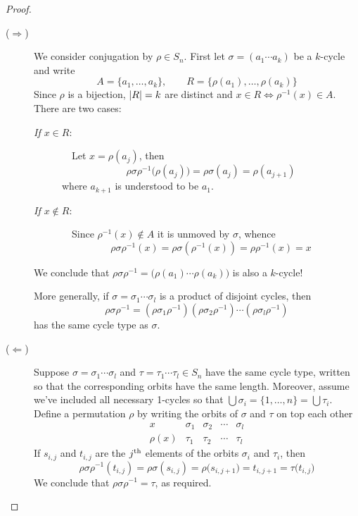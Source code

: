 \begin{proof}
	\begin{description}
		\item[\normalfont($\Rightarrow$)] We consider conjugation by $\rho\in S_n$. First let $\sigma=(a_1\cdots a_k)$ be a $k$-cycle and write
		\[
			A=\{a_1,\ldots,a_k\},\qquad R=\{\rho(a_1),\ldots,\rho(a_k)\}
		\]
		Since $\rho$ is a bijection, $\left| R\right|=k$ are distinct and $x\in R\iff \rho^{-1}(x)\in A$. There are two cases:
		\begin{description}
			\item[\normalfont\emph{If $x\in R$}:] \ \ Let $x=\rho(a_j)$, then
			\[
				\rho\sigma\rho^{-1}\bigl(\rho(a_j)\bigr)
				=\rho\sigma(a_j)=\rho(a_{j+1})
			\]
			where $a_{k+1}$ is understood to be $a_1$.
			\item[\normalfont\emph{If $x\not\in R$}:] \ \ Since $\rho^{-1}(x)\not\in A$ it is unmoved by $\sigma$, whence
			\[
				\rho\sigma\rho^{-1}(x) 
				=\rho\sigma(\rho^{-1}(x))
				=\rho\rho^{-1}(x)=x
			\]
		\end{description}
		We conclude that $\rho\sigma\rho^{-1}=\bigl(\rho(a_1)\cdots\rho(a_k)\bigr)$	is also a $k$-cycle!\par
		More generally, if $\sigma=\sigma_1\cdots\sigma_l$ is a product of disjoint cycles, then
		\[
			\rho\sigma\rho^{-1}=(\rho\sigma_1\rho^{-1})(\rho\sigma_2\rho^{-1})\cdots (\rho\sigma_l\rho^{-1})
		\]
		has the same cycle type as $\sigma$.
		\item[\normalfont($\Leftarrow$)] Suppose $\sigma=\sigma_1\cdots\sigma_l$ and $\tau=\tau_1\cdots\tau_l\in S_n$ have the same cycle type, written so that the corresponding orbits have the same length. Moreover, assume we've included all necessary 1-cycles so that $\bigcup\sigma_i=\{1,\ldots,n\}=\bigcup\tau_i$. Define a permutation $\rho$ by writing the orbits of $\sigma$ and $\tau$ on top each other
		\[
			\begin{array}{l|cccccccc}
	      x&\sigma_1 &\sigma_2 & \cdots & \sigma_l\\\hline
	      \rho(x)&\tau_1 & \tau_2 & \cdots & \tau_l
	    \end{array}
	  \]
	If $s_{i,j}$ and $t_{i,j}$ are the $j\textsuperscript{th}$ elements of the orbits $\sigma_i$ and $\tau_i$, then
		\[
			\rho\sigma\rho^{-1}(t_{i,j})
			=\rho\sigma(s_{i,j})=\rho\bigl(s_{i,j+1}\bigr)
			=t_{i,j+1}=\tau\bigl(t_{i,j}\bigr)
		\]
		We conclude that $\rho\sigma\rho^{-1}=\tau$, as required.\qedhere
	\end{description}
\end{proof}

